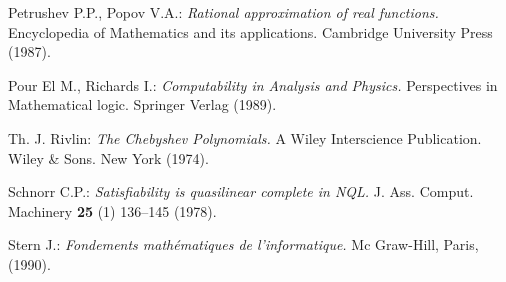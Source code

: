 \begin{thebibliography}{50}
 Petrushev P.P., Popov V.A.: {\em Rational approximation of real functions.}
Encyclopedia of Mathematics and its applications. Cambridge University Press (1987).

 Pour El M., Richards I.: {\em Computability in Analysis and 
Physics.} Perspectives in Mathematical logic. Springer Verlag (1989).

 Th. J. Rivlin: {\em The Chebyshev Polynomials.}
A Wiley Interscience Publication. Wiley \& Sons. New York (1974). 

 Schnorr C.P.: {\em Satisfiability is quasilinear complete in NQL.}
J. Ass. Comput. Machinery {\bf 25} (1) 136--145 (1978).

 Stern J.: {\em Fondements mathématiques de l'informatique.}
Mc Graw-Hill, Paris, (1990).

\end{thebibliography}






